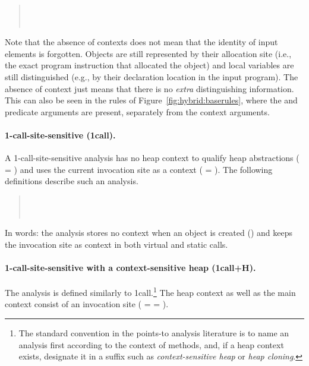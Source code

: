 \begin{quote}
\\
 \\
\end{quote}

Note that the absence of contexts does not mean that the identity of input elements is forgotten. Objects are still represented by their allocation site (i.e., the exact program instruction that allocated the object) and local variables are still distinguished (e.g., by their declaration location in the input program). The absence of context just means that there is no \emph{extra} distinguishing information. This can also be seen in the rules of Figure~\ref{fig:hybrid:baserules}, where the  and  predicate arguments are present, separately from the context arguments.

\paragraph{1-call-site-sensitive (1call).}
A 1-call-site-sensitive analysis has no heap context to qualify heap abstractions ( = \args{\{$\star$\}}) and uses the current invocation site as a context ( = ). The following definitions describe such an analysis.

\begin{quote}
 \\
 \\
\end{quote}

In words: the analysis stores no context when an object is created () and keeps the invocation site as context in both virtual and static calls.

\paragraph{1-call-site-sensitive with a context-sensitive heap (1call+H).}
The analysis is defined similarly to 1call.\footnote{The standard convention in the points-to analysis literature is to name an analysis first according to the context of methods, and, if a heap context exists, designate it in a suffix such as \emph{context-sensitive heap} or \emph{heap cloning}.}  The heap context as well as the main context consist of an invocation site ( =  = ).

